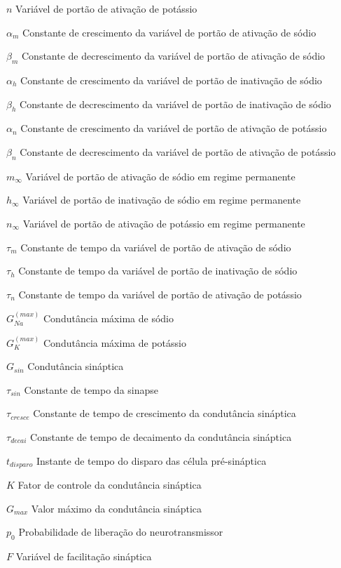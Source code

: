 \documentclass[
	12pt,				%
	openright,			%
	oneside,			%
	a4paper,			%
	chapter=TITLE,		%
	english,			%
	french,				%
	spanish,			%
	brazil				%
	]{abntex2}
\theoremstyle{definition}
\begin{document}
\begin{simbolos}
\item[$n$] Variável de portão de ativação de potássio
\item[$\alpha_m$] Constante de crescimento da variável de portão de ativação de sódio
\item[$\beta_m$] Constante de decrescimento da variável de portão de ativação de sódio
\item[$\alpha_h$] Constante de crescimento da variável de portão de inativação de sódio
\item[$\beta_h$] Constante de decrescimento da variável de portão de inativação de sódio
\item[$\alpha_n$] Constante de crescimento da variável de portão de ativação de potássio
\item[$\beta_n$] Constante de decrescimento da variável de portão de ativação de potássio
\item[$m_\infty$] Variável de portão de ativação de sódio em regime permanente
\item[$h_\infty$] Variável de portão de inativação de sódio em regime permanente
\item[$n_\infty$] Variável de portão de ativação de potássio em regime permanente
\item[$\tau_m$] Constante de tempo da variável de portão de ativação de sódio
\item[$\tau_h$] Constante de tempo da variável de portão de inativação de sódio
\item[$\tau_n$] Constante de tempo da variável de portão de ativação de potássio
\item[$G_{Na}^{(max)}$] Condutância máxima de sódio
\item[$G_K^{(max)}$] Condutância máxima de potássio
\item[$G_{sin}$] Condutância sináptica
\item[$\tau_{sin}$] Constante de tempo da sinapse
\item[$\tau_{cresce}$] Constante de tempo de crescimento da condutância sináptica
\item[$\tau_{decai}$] Constante de tempo de decaimento da condutância sináptica
\item[$t_{disparo}$] Instante de tempo do disparo das célula pré-sináptica
\item[$K$] Fator de controle da condutância sináptica
\item[$G_{max}$] Valor máximo da condutância sináptica
\item[$p_0$] Probabilidade de liberação do neurotransmissor
\item[$F$] Variável de facilitação sináptica

\end{simbolos}
\end{document}
